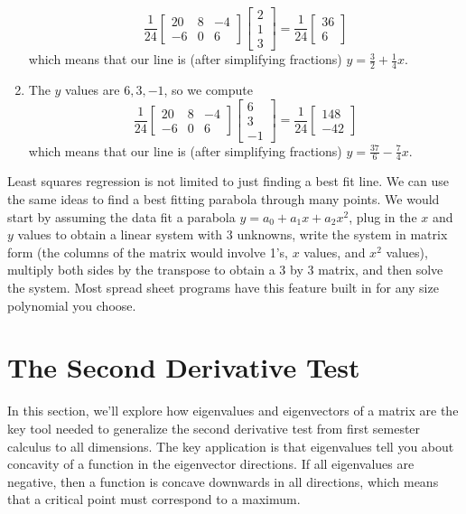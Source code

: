 \begin{example}
\begin{enumerate}
$$\frac{1}{24}\begin{bmatrix}20&8&-4\\-6&0&6\end{bmatrix} \begin{bmatrix}2\\1\\3\end{bmatrix}
= \frac{1}{24}\begin{bmatrix}36\\6\end{bmatrix}
$$ which means that our line is (after simplifying fractions) $y=\frac{3}{2}+\frac{1}{4}x$.
	\item The $y$ values are $6,3,-1$, so we compute
$$\frac{1}{24}\begin{bmatrix}20&8&-4\\-6&0&6\end{bmatrix} \begin{bmatrix}6\\3\\-1\end{bmatrix}
= \frac{1}{24}\begin{bmatrix}148\\-42\end{bmatrix}
$$ which means that our line is (after simplifying fractions) $y=\frac{37}{6}-\frac{7}{4}x$.
\end{enumerate}
\end{example}

Least squares regression is not limited to just finding a best fit line.  We can use the same ideas to find a best fitting parabola through many points.  We would start by assuming the data fit a parabola $y=a_0+a_1x+a_2x^2$, plug in the $x$ and $y$ values to obtain a linear system with 3 unknowns, write the system in matrix form (the columns of the matrix would involve 1's, $x$ values, and $x^2$ values), multiply both sides by the transpose to obtain a 3 by 3 matrix, and then solve the system.  Most spread sheet programs have this feature built in for any size polynomial you choose.









\section{The Second Derivative Test}

In this section, we'll explore how eigenvalues and eigenvectors of a matrix are the key tool needed to generalize the second derivative test from first semester calculus to all dimensions. The key application is that eigenvalues tell you about concavity of a function in the eigenvector directions.  If all eigenvalues are negative, then a function is concave downwards in all directions, which means that a critical point must correspond to a maximum.    

